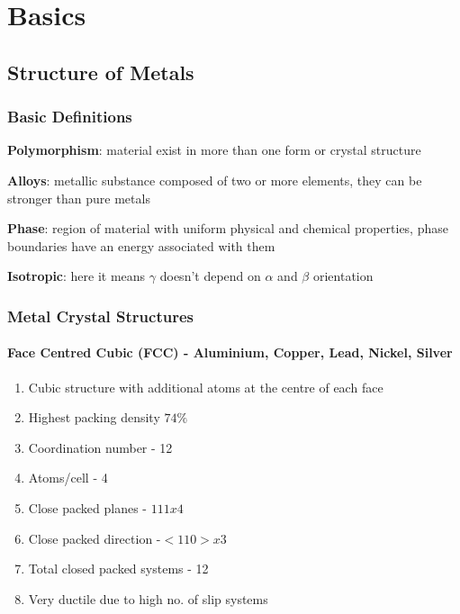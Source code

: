 
\chapter{Basics}
\section{Structure of Metals}
\subsection{Basic Definitions}

\textbf{Polymorphism}: material exist in more than one form or crystal structure

\textbf{Alloys}: metallic substance composed of two or more elements, they can be stronger than pure metals 

\textbf{Phase}: region of material with uniform physical and chemical properties, phase boundaries have an energy associated with them

\textbf{Isotropic}: here it means $\gamma$ doesn't depend on $\alpha$ and $\beta$ orientation

\subsection{Metal Crystal Structures} %
\label{sub:metal_crystal_structures}


\subsubsection{Face Centred Cubic (FCC) - Aluminium, Copper, Lead, Nickel, Silver}
\begin{enumerate}
  \item Cubic structure with additional atoms at the centre of each face
  \item Highest packing density $74\%$
  \item Coordination number - 12
  \item Atoms/cell - 4
  \item Close packed planes - ${111} x 4$
  \item Close packed direction -$ <110> x 3$
  \item Total closed packed systems - 12
  \item Very ductile due to high no. of slip systems
\end{enumerate}

